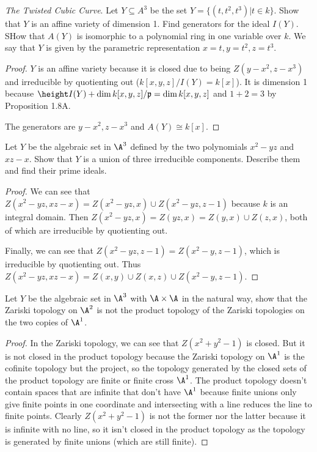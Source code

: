 \begin{exercise}%
\textit{The Twisted Cubic Curve}. Let $Y \subseteq A^3  $ be the set $Y = \{(t,t^2,t^3 )|t\in k\}   $. Show that $Y $ is an affine variety of dimension 1. Find generators for the ideal $I(Y) $. SHow that $A(Y) $ is isomorphic to a polynomial ring in one variable over $k $. We say that $Y $ is given by the parametric representation $x=t,y=t^2,z=t^3  $.
\end{exercise}
\begin{proof}
	$Y $ is an affine variety because it is closed due to being $Z(y-x^2,z-x^3) $ and irreducible by quotienting out ($k[x,y,z] / I(Y) = k[x] $).
	It is dimension 1 because $\height I(Y) + \dim k[x,y,z] / \mathfrak{p} = \dim k[x,y,z] $ and $1 + 2 = 3 $ by Proposition 1.8A.

	The generators are $y-x^2,z-x^3  $ and $A(Y) \cong k[x] $.
\end{proof}

\begin{exercise}%
Let $Y $ be the algebraic set in $\A^3 $ defined by the two polynomials $x^2-yz $ and $xz-x $. Show that $Y $ is a union of three irreducible components. Describe them and find their prime ideals.
\end{exercise}
\begin{proof}
	We can see that $Z(x^2-yz,xz-x) = Z(x^2-yz,x)\cup Z(x^2-yz,z-1)$ because $k $ is an integral domain.
	Then $Z(x^2-yz,x) = Z(yz,x) = Z(y,x)\cup Z(z,x)$, both of which are irreducible by quotienting out.

	Finally, we can see that $Z(x^2-yz,z-1) = Z(x^2-y,z-1) $, which is irreducible by quotienting out.
	Thus $Z(x^2-yz,xz-x) = Z(x,y)\cup Z(x,z)\cup Z(x^2-y,z-1) $.
\end{proof}

\begin{exercise}%
Let $Y $ be the algebraic set in $\A^3$ with $\A\times \A $ in the natural way, show that the Zariski topology on $\A^2$ is not the product topology of the Zariski topologies on the two copies of $\A^1 $.
\end{exercise}
\begin{proof}
	In the Zariski topology, we can see that $Z(x^2+y^2-1) $ is closed.
	But it is not closed in the product topology because the Zariski topology on $\A^1 $ is the cofinite topology but the project, so the topology generated by the closed sets of the product topology are finite or finite cross $\A^1 $.
	The product topology doesn't contain spaces that are infinite that don't have $\A^1 $ because finite unions only give finite points in one coordinate and intersecting with a line reduces the line to finite points.
	Clearly $Z(x^2+y^2-1) $ is not the former nor the latter because it is infinite with no line, so it isn't closed in the product topology as the topology is generated by finite unions (which are still finite).
\end{proof}

